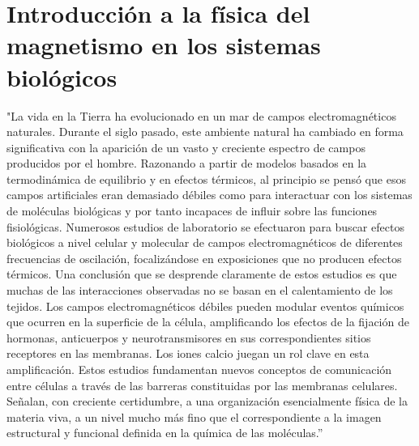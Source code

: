 
\chapter{Introducción a la física del magnetismo en los sistemas biológicos} %

\label{sistemasBiologicos} %






"La vida en la Tierra ha evolucionado en un mar de campos electromagnéticos naturales. Durante el siglo pasado, este ambiente natural ha cambiado en forma significativa con la aparición de un vasto y creciente espectro de campos producidos por el hombre. Razonando a partir de modelos basados en la termodinámica de equilibrio y en efectos térmicos, al principio se pensó que esos campos artificiales eran demasiado débiles como para interactuar con los sistemas de moléculas biológicas y por tanto incapaces de influir sobre las funciones fisiológicas. Numerosos estudios de laboratorio se efectuaron para buscar efectos biológicos a nivel celular y molecular de campos electromagnéticos de diferentes frecuencias de oscilación, focalizándose en exposiciones que no producen efectos térmicos. Una conclusión que se desprende claramente de estos estudios es que muchas de las interacciones observadas no se basan en el calentamiento de los tejidos. Los campos electromagnéticos débiles pueden modular eventos químicos que ocurren en la superficie de la célula, amplificando los efectos de la fijación de hormonas, anticuerpos y neurotransmisores en sus correspondientes sitios receptores en las membranas. Los iones calcio juegan un rol clave en esta amplificación. Estos estudios fundamentan nuevos conceptos de comunicación entre células a través de las barreras constituidas por las membranas celulares. Señalan, con creciente certidumbre, a una organización esencialmente física de la materia viva, a un nivel mucho más fino que el correspondiente a la imagen estructural y funcional definida en la química de las moléculas\citep{RossAdey}.”


